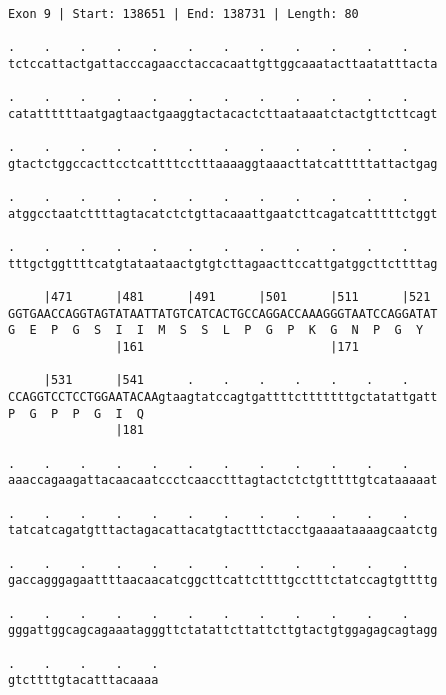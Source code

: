 \documentclass{article}
\begin{document}
\begin{Verbatim}[fontfamily=courier]
Exon 9 | Start: 138651 | End: 138731 | Length: 80

.    .    .    .    .    .    .    .    .    .    .    .    
tctccattactgattacccagaacctaccacaattgttggcaaatacttaatatttacta

.    .    .    .    .    .    .    .    .    .    .    .    
catattttttaatgagtaactgaaggtactacactcttaataaatctactgttcttcagt

.    .    .    .    .    .    .    .    .    .    .    .    
gtactctggccacttcctcattttcctttaaaaggtaaacttatcatttttattactgag

.    .    .    .    .    .    .    .    .    .    .    .    
atggcctaatcttttagtacatctctgttacaaattgaatcttcagatcatttttctggt

.    .    .    .    .    .    .    .    .    .    .    .    
tttgctggttttcatgtataataactgtgtcttagaacttccattgatggcttcttttag

     |471      |481      |491      |501      |511      |521 
GGTGAACCAGGTAGTATAATTATGTCATCACTGCCAGGACCAAAGGGTAATCCAGGATAT
G  E  P  G  S  I  I  M  S  S  L  P  G  P  K  G  N  P  G  Y  
               |161                          |171           

     |531      |541      .    .    .    .    .    .    .    
CCAGGTCCTCCTGGAATACAAgtaagtatccagtgattttctttttttgctatattgatt
P  G  P  P  G  I  Q                                         
               |181                                         

.    .    .    .    .    .    .    .    .    .    .    .    
aaaccagaagattacaacaatccctcaacctttagtactctctgtttttgtcataaaaat

.    .    .    .    .    .    .    .    .    .    .    .    
tatcatcagatgtttactagacattacatgtactttctacctgaaaataaaagcaatctg

.    .    .    .    .    .    .    .    .    .    .    .    
gaccagggagaattttaacaacatcggcttcattcttttgcctttctatccagtgttttg

.    .    .    .    .    .    .    .    .    .    .    .    
gggattggcagcagaaatagggttctatattcttattcttgtactgtggagagcagtagg

.    .    .    .    .
gtcttttgtacatttacaaaa
\end{Verbatim}
\newpage
\end{document}
